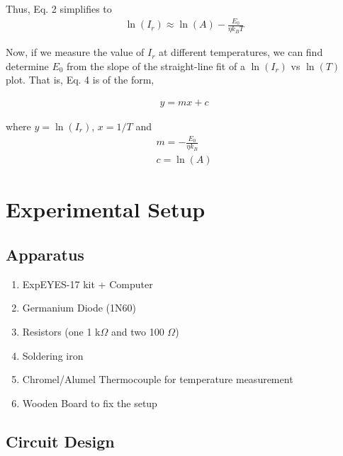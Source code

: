 Thus, Eq. 2 simplifies to 
\begin{align}
    \ln{(I_r)} \approx \ln(A) - \frac{E_0}{\eta k_B T}
\end{align}

Now, if we measure the value of $I_r$ at different temperatures, we can find determine $E_0$ from the slope of the straight-line fit of a $\ln(I_r)$ vs $\ln(T)$ plot. That is, Eq. 4 is of the form,

\begin{align}
    y = mx + c
\end{align}

where $y=\ln(I_r)$, $x=1/T$ and 
\begin{align} \label{slope}
    m = -\frac{E_0}{\eta k_B}\\
    c = \ln(A)
\end{align}
\section{Experimental Setup}

\subsection{Apparatus}

\begin{enumerate}
    \item ExpEYES-17 kit + Computer
    \item Germanium Diode (1N60)
    \item Resistors (one 1 k$\Omega$ and two 100 $\Omega$)
    \item Soldering iron
    \item Chromel/Alumel Thermocouple for temperature measurement
    \item Wooden Board to fix the setup
\end{enumerate}

\subsection{Circuit Design}

